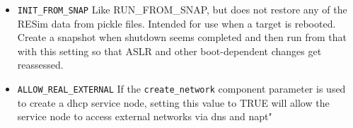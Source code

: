 \documentclass[titlepage]{article}
\begin{document}
\begin{itemize}
where a slow-loading component is started into a quiecient state, and then other components are added to the simulation.
\item {\tt INIT\_FROM\_SNAP} Like RUN\_FROM\_SNAP, but does not restore any of the RESim data from pickle files.  Intended for use when a target is rebooted.
Create a snapshot when shutdown seems completed and then run from that with this setting so that ASLR and other boot-dependent changes get reassessed.
\item {\tt ALLOW\_REAL\_EXTERNAL} If the {\tt create\_network} component parameter is used to create a dhcp service node, setting this value
to TRUE will allow the service node to access external networks via dns and napt"

\end{itemize}
\end{document}
